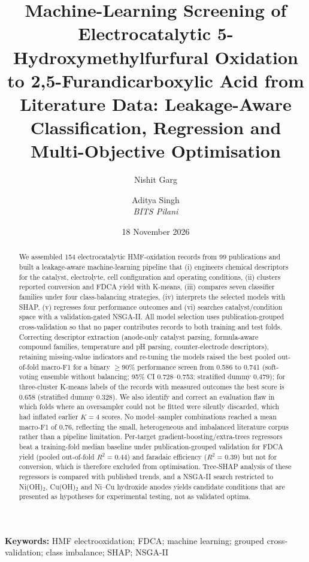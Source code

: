 \documentclass[11pt,a4paper]{article}
\title{Machine-Learning Screening of Electrocatalytic 5-Hydroxymethylfurfural
Oxidation to 2,5-Furandicarboxylic Acid from Literature Data: Leakage-Aware Classification,
Regression and Multi-Objective Optimisation}
\author{Nishit Garg \and Aditya Singh\\[0.4em]
\textit{BITS Pilani}}
\date{18 November 2026}
\begin{document}
\maketitle
\begin{abstract}
We assembled 154 electrocatalytic HMF-oxidation records from 99 publications and built a leakage-aware machine-learning pipeline that (i) engineers chemical descriptors for the catalyst, electrolyte, cell configuration and operating conditions, (ii) clusters reported conversion and FDCA yield with K-means, (iii) compares seven classifier families under four class-balancing strategies, (iv) interprets the selected models with SHAP, (v) regresses four performance outcomes and (vi) searches catalyst/condition space with a validation-gated NSGA-II. All model selection uses publication-grouped cross-validation so that no paper contributes records to both training and test folds. Correcting descriptor extraction (anode-only catalyst parsing, formula-aware compound families, temperature and pH parsing, counter-electrode descriptors), retaining missing-value indicators and re-tuning the models raised the best pooled out-of-fold macro-F1 for a binary $\geq$90\% performance screen from 0.586 to 0.741 (soft-voting ensemble without balancing; 95\% CI 0.728--0.753; stratified dummy 0.479); for three-cluster K-means labels of the records with measured outcomes the best score is 0.658 (stratified dummy 0.328). We also identify and correct an evaluation flaw in which folds where an oversampler could not be fitted were silently discarded, which had inflated earlier $K=4$ scores. No model--sampler combinations reached a mean macro-F1 of 0.76, reflecting the small, heterogeneous and imbalanced literature corpus rather than a pipeline limitation. Per-target gradient-boosting/extra-trees regressors beat a training-fold median baseline under publication-grouped validation for FDCA yield (pooled out-of-fold $R^2=0.44$) and faradaic efficiency ($R^2=0.39$) but not for conversion, which is therefore excluded from optimisation. Tree-SHAP analysis of these regressors is compared with published trends, and a NSGA-II search restricted to Ni(OH)$_2$, Cu(OH)$_2$ and Ni--Cu hydroxide anodes yields candidate conditions that are presented as hypotheses for experimental testing, not as validated optima.
\end{abstract}
\noindent\textbf{Keywords:} HMF electrooxidation; FDCA; machine learning; grouped cross-validation; class imbalance; SHAP; NSGA-II
\end{document}
